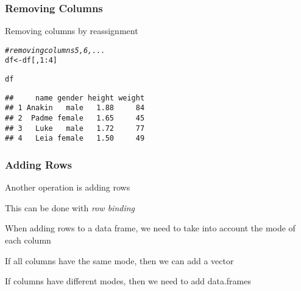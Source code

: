 \documentclass[12pt]{beamer}\usepackage[]{graphicx}\usepackage[]{color}
\makeatletter
\newcommand{\hlnum}[1]{\textcolor[rgb]{0.686,0.059,0.569}{#1}}%
\newcommand{\hlcom}[1]{\textcolor[rgb]{0.678,0.584,0.686}{\textit{#1}}}%
\newcommand{\hlopt}[1]{\textcolor[rgb]{0,0,0}{#1}}%
\newcommand{\hlstd}[1]{\textcolor[rgb]{0.345,0.345,0.345}{#1}}%
\newcommand{\hlkwb}[1]{\textcolor[rgb]{0.69,0.353,0.396}{#1}}%
\newenvironment{kframe}{%
 \def\at@end@of@kframe{}%
 \ifinner\ifhmode%
  \def\at@end@of@kframe{\end{minipage}}%
  \begin{minipage}{\columnwidth}%
 \fi\fi%
 \def\FrameCommand##1{\hskip\@totalleftmargin \hskip-\fboxsep
 \colorbox{shadecolor}{##1}\hskip-\fboxsep
     \hskip-\linewidth \hskip-\@totalleftmargin \hskip\columnwidth}%
 \MakeFramed {\advance\hsize-\width
   \@totalleftmargin\z@ \linewidth\hsize
   \@setminipage}}%
 {\par\unskip\endMakeFramed%
 \at@end@of@kframe}
\newenvironment{knitrout}{}{} %
\makeatother
\begin{document}
\begin{frame}[fragile]
\frametitle{Removing Columns}

Removing columns by reassignment
\begin{knitrout}\footnotesize
{}\color{fgcolor}\begin{kframe}
\begin{alltt}
\hlcom{# removing columns 5, 6, ...}
\hlstd{df} \hlkwb{<-} \hlstd{df[ ,} \hlnum{1}\hlopt{:}\hlnum{4}\hlstd{]}

\hlstd{df}
\end{alltt}
\begin{verbatim}
##     name gender height weight
## 1 Anakin   male   1.88     84
## 2  Padme female   1.65     45
## 3   Luke   male   1.72     77
## 4   Leia female   1.50     49
\end{verbatim}
\end{kframe}
\end{knitrout}

\end{frame}


\begin{frame}[fragile]
\frametitle{Adding Rows}

\bi
  \item Another operation is adding rows
  \item This can be done with \textit{row binding} 
  \item When adding rows to a data frame, we need to take into account the mode of each column
  \item If all columns have the same mode, then we can add a vector
  \item If columns have different modes, then we need to add data.frames
\ei

\end{frame}

\end{document}
